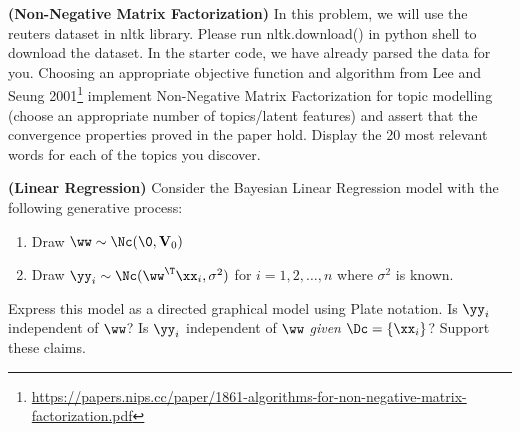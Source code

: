 \documentclass[12pt,letterpaper,fleqn]{hmcpset}
\begin{document}
\begin{problem}
\textbf{(Non-Negative Matrix Factorization)} 
In this problem, we will use the reuters dataset in nltk library. Please run nltk.download() in python shell to download the dataset. In the starter code, we have already parsed the data for you. 
\newline
\newline
Choosing an appropriate
objective function and algorithm from Lee and Seung 2001\footnote{\url{https://papers.nips.cc/paper/1861-algorithms-for-non-negative-matrix-factorization.pdf}}
implement Non-Negative Matrix Factorization for topic modelling (choose an appropriate number
of topics/latent features) and assert that the convergence properties proved in the paper hold. 
Display the 20 most relevant words for each of the topics you discover.
\end{problem}
\begin{solution}
\vfill
\end{solution}
\newpage

\begin{problem}
\textbf{(Linear Regression)} Consider the Bayesian Linear Regression model with
the following generative process:
\begin{enumerate}[(1)]
    \item Draw $\ww \sim \Nc(\0, \mathbf{V}_0)$
    \item Draw $\yy_i \sim \Nc(\ww^\T\xx_i, \sigma^2)$ for $i=1,2,\dots,n$ where $\sigma^2$
        is known.
\end{enumerate}
Express this model as a directed graphical model using Plate notation. Is $\yy_i$
independent of $\ww$? Is $\yy_i$ independent of $\ww$ \textit{given} $\Dc = \{\xx_i\}$? Support
these claims.
\end{problem}
\begin{solution}
\vfill
\end{solution}
\newpage
\end{document}
